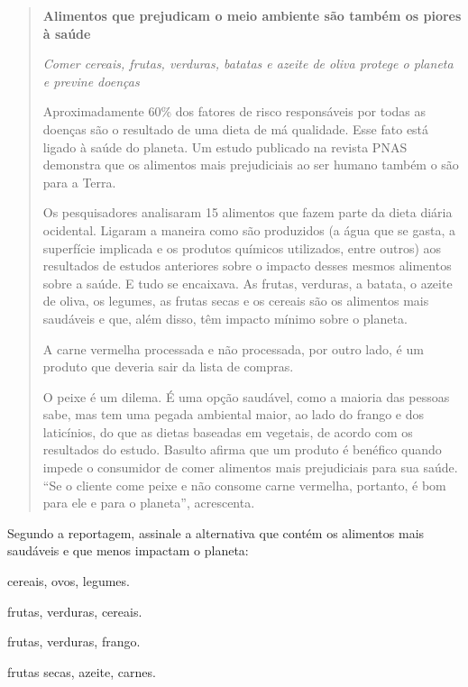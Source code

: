 \begin{quote}

\textbf{Alimentos que prejudicam o meio ambiente são também os piores à
saúde}

\textit{Comer cereais, frutas, verduras, batatas e azeite de oliva protege o
planeta e previne doenças}

Aproximadamente 60\% dos fatores de risco responsáveis por todas as
doenças são o resultado de uma dieta de má qualidade. Esse fato está
ligado à saúde do planeta. Um estudo publicado na revista PNAS demonstra
que os alimentos mais prejudiciais ao ser humano também o são para a
Terra.

Os pesquisadores analisaram 15 alimentos que fazem parte da dieta diária
ocidental. Ligaram a maneira como são produzidos (a água que se gasta, a
superfície implicada e os produtos químicos utilizados, entre outros)
aos resultados de estudos anteriores sobre o impacto desses mesmos
alimentos sobre a saúde. E tudo se encaixava. As frutas, verduras, a
batata, o azeite de oliva, os legumes, as frutas secas e os cereais são
os alimentos mais saudáveis e que, além disso, têm impacto mínimo sobre
o planeta.

A carne vermelha processada e não processada, por outro lado, é um
produto que deveria sair da lista de compras.

O peixe é um dilema. É uma opção saudável, como a maioria das pessoas
sabe, mas tem uma pegada ambiental maior, ao lado do frango e dos
laticínios, do que as dietas baseadas em vegetais, de acordo com os
resultados do estudo. Basulto afirma que um produto é benéfico quando
impede o consumidor de comer alimentos mais prejudiciais para sua saúde.
``Se o cliente come peixe e não consome carne vermelha, portanto, é bom
para ele e para o planeta'', acrescenta.


\end{quote}

Segundo a reportagem, assinale a alternativa que contém os alimentos
mais saudáveis e que menos impactam o planeta:

\begin{escolha}
  
    \item cereais, ovos, legumes.
  
    \item frutas, verduras, cereais.
  
    \item frutas, verduras, frango.
  
    \item frutas secas, azeite, carnes.

\end{escolha}


